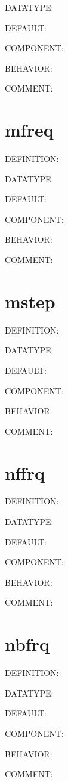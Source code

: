 {\color{green}DATATYPE:}

{\color{blue}DEFAULT:}

{\color{brown}COMPONENT:}

{\color{purple}BEHAVIOR:}

{\color{olive}COMMENT:}

\section{mfreq}
{\color{red}DEFINITION:}

{\color{green}DATATYPE:}

{\color{blue}DEFAULT:}

{\color{brown}COMPONENT:}

{\color{purple}BEHAVIOR:}

{\color{olive}COMMENT:}

\section{mstep}
{\color{red}DEFINITION:}

{\color{green}DATATYPE:}

{\color{blue}DEFAULT:}

{\color{brown}COMPONENT:}

{\color{purple}BEHAVIOR:}

{\color{olive}COMMENT:}

\section{nffrq}
{\color{red}DEFINITION:}

{\color{green}DATATYPE:}

{\color{blue}DEFAULT:}

{\color{brown}COMPONENT:}

{\color{purple}BEHAVIOR:}

{\color{olive}COMMENT:}

\section{nbfrq}
{\color{red}DEFINITION:}

{\color{green}DATATYPE:}

{\color{blue}DEFAULT:}

{\color{brown}COMPONENT:}

{\color{purple}BEHAVIOR:}

{\color{olive}COMMENT:}

